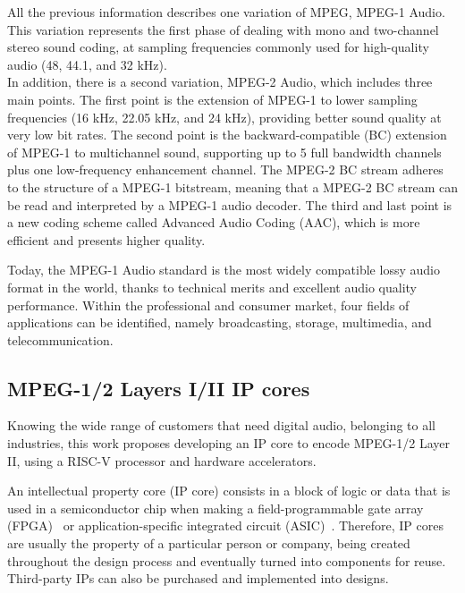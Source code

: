 All the previous information describes one variation of MPEG, MPEG-1 Audio. This variation represents the first phase of dealing with mono and two-channel stereo sound coding, at sampling frequencies commonly used for high-quality audio (48, 44.1, and 32 kHz).\\
In addition, there is a second variation, MPEG-2 Audio, which includes three main points.
The first point is the extension of MPEG-1 to lower sampling frequencies (16 kHz, 22.05 kHz, and 24 kHz), providing better sound quality at very low bit rates.
The second point is the backward-compatible (BC) extension of MPEG-1 to multichannel sound, supporting up to 5 full bandwidth channels plus one low-frequency enhancement channel. The MPEG-2 BC stream adheres to the structure of a MPEG-1 bitstream, meaning that a MPEG-2 BC stream can be read and interpreted by a MPEG-1 audio decoder.
The third and last point is a new coding scheme called Advanced Audio Coding (AAC), which is more efficient and presents higher quality.
 
Today, the MPEG-1 Audio standard is the most widely compatible lossy audio format in the world, thanks to technical merits and excellent audio quality performance.
Within the professional and consumer market, four fields of applications can be identified, namely broadcasting, storage, multimedia, and telecommunication. %

\subsection{MPEG-1/2 Layers I/II IP cores}

Knowing the wide range of customers that need digital audio, belonging to all industries, this work proposes developing an IP core to encode MPEG-1/2 Layer II, using a RISC-V processor and hardware accelerators.
 
An intellectual property core (IP core) consists in a block of logic or data that is used in a semiconductor chip when making a field-programmable gate array (FPGA)~\cite{fpga} or application-specific integrated circuit (ASIC)~\cite{asic}.
Therefore, IP cores are usually the property of a particular person or company, being created throughout the design process and eventually turned into components for reuse. Third-party IPs can also be purchased and implemented into designs. 

